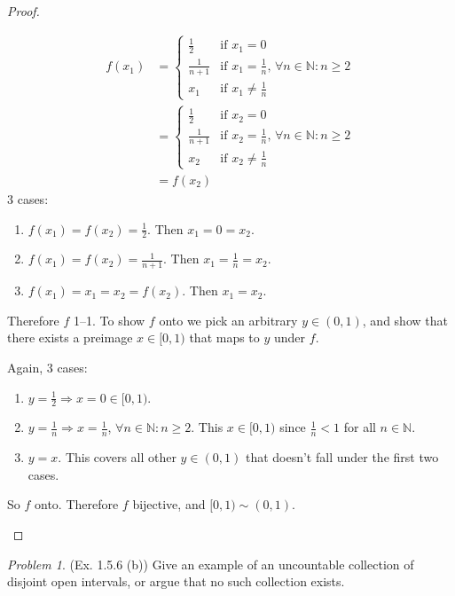 \documentclass[11pt,twoside, reqno]{amsart}
\theoremstyle{remark}
\newtheorem{Prob}{Problem}
\def\N{\mathbb N}
\renewcommand{\implies}{\Rightarrow}
\begin{document}
\begin{proof}
\begin{enumerate}
\begin{align*}
    f(x_1) &= 
    \begin{cases}
        \frac{1}{2} & \text{if $x_1 = 0$}\\
        \frac{1}{n+1} & \text{if $x_1 = \frac{1}{n}$, $\forall n \in \N : n \geq 2$}\\
        x_1 & \text{if $x_1 \neq \frac{1}{n}$}
    \end{cases}\\
    &= 
    \begin{cases}
        \frac{1}{2} & \text{if $x_2 = 0$}\\
        \frac{1}{n+1} & \text{if $x_2 = \frac{1}{n}$, $\forall n \in \N : n \geq 2$}\\
        x_2 & \text{if $x_2 \neq \frac{1}{n}$}
    \end{cases}\\
    &= f(x_2)
\end{align*}
3 cases:
\begin{enumerate}
    \item[(1)] $f(x_1) = f(x_2) = \frac{1}{2}$. Then $x_1 = 0 = x_2$.
    \item[(2)] $f(x_1) = f(x_2) = \frac{1}{n+1}$. Then $x_1 = \frac{1}{n} = x_2$.
    \item[(3)] $f(x_1) = x_1 = x_2 = f(x_2)$. Then $x_1 = x_2$.
\end{enumerate}
Therefore $f$ 1--1. To show $f$ onto we pick an arbitrary $y \in (0,1)$, and show that there exists a preimage $x \in [0,1)$ that maps to $y$ under $f$.

Again, 3 cases:
\begin{enumerate}
    \item[(1)] $y = \frac{1}{2} \implies x = 0 \in [0,1)$.
    \item[(2)] $y = \frac{1}{n} \implies x = \frac{1}{n}$, $\forall n \in \N : n \geq 2$. This $x \in [0,1)$ since $\frac{1}{n} < 1$ for all $n \in \N$.
    \item[(3)] $y = x$. This covers all other $y \in (0,1)$ that doesn't fall under the first two cases.
\end{enumerate}
So $f$ onto. Therefore $f$ bijective, and $[0,1) \sim (0,1)$.
\end{enumerate}
\end{proof}

\begin{Prob}(Ex. 1.5.6 (b)) Give an example of an uncountable collection of disjoint open intervals, or argue that no such collection exists.
\end{Prob}
\end{document}
